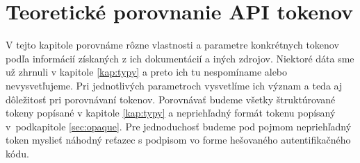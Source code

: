 \chapter{Teoretické porovnanie API tokenov}

\label{kap:teoreticke} %

V tejto kapitole porovnáme rôzne vlastnosti a parametre konkrétnych tokenov podľa informácií získaných z ich dokumentácií a iných zdrojov. Niektoré dáta sme už zhrnuli v kapitole \ref{kap:typy} a preto ich tu nespomíname alebo nevysvetľujeme. Pri jednotlivých parametroch vysvetlíme ich význam a teda aj dôležitosť pri porovnávaní tokenov. Porovnávať budeme všetky štruktúrované tokeny popísané v kapitole \ref{kap:typy} a nepriehľadný formát tokenu popísaný v~podkapitole \ref{sec:opaque}. Pre jednoduchosť budeme pod pojmom nepriehľadný token myslieť náhodný reťazec s podpisom vo forme hešovaného autentifikačného kódu. 

